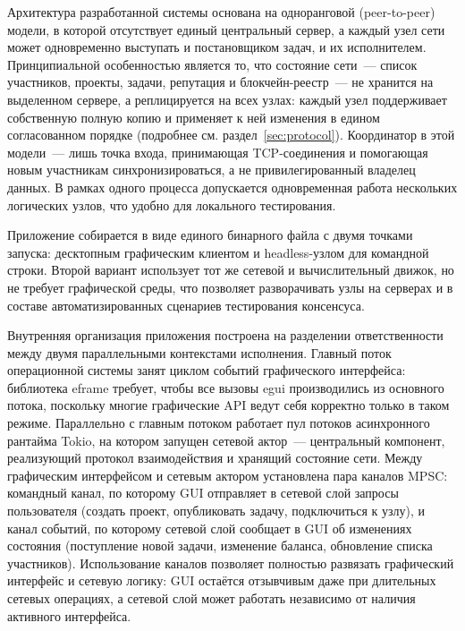 \documentclass[a4paper,11pt]{extarticle}
\begin{document}
Архитектура разработанной системы основана на одноранговой (peer-to-peer)
модели, в которой отсутствует единый центральный сервер, а каждый узел сети
может одновременно выступать и постановщиком задач, и их исполнителем.
Принципиальной особенностью является то, что состояние сети~--- список
участников, проекты, задачи, репутация и блокчейн-реестр~--- не хранится на
выделенном сервере, а реплицируется на всех узлах: каждый узел поддерживает
собственную полную копию и применяет к ней изменения в едином согласованном
порядке (подробнее см. раздел~\ref{sec:protocol}). Координатор в этой модели~---
лишь точка входа, принимающая TCP-соединения и помогающая новым участникам
синхронизироваться, а не привилегированный владелец данных. В рамках одного
процесса допускается одновременная работа нескольких логических узлов, что
удобно для локального тестирования.

Приложение собирается в виде единого бинарного файла с двумя точками запуска:
десктопным графическим клиентом и headless-узлом для командной строки. Второй
вариант использует тот же сетевой и вычислительный движок, но не требует
графической среды, что позволяет разворачивать узлы на серверах и в составе
автоматизированных сценариев тестирования консенсуса.

Внутренняя организация приложения построена на разделении ответственности
между двумя параллельными контекстами исполнения. Главный поток операционной
системы занят циклом событий графического интерфейса: библиотека eframe
требует, чтобы все вызовы egui производились из основного потока, поскольку
многие графические API ведут себя корректно только в таком режиме. Параллельно
с главным потоком работает пул потоков асинхронного рантайма Tokio, на котором
запущен сетевой актор~--- центральный компонент, реализующий протокол
взаимодействия и хранящий состояние сети. Между графическим интерфейсом и
сетевым актором установлена пара каналов MPSC: командный канал, по которому
GUI отправляет в сетевой слой запросы пользователя (создать проект, опубликовать
задачу, подключиться к узлу), и канал событий, по которому сетевой слой
сообщает в GUI об изменениях состояния (поступление новой задачи, изменение
баланса, обновление списка участников). Использование каналов позволяет
полностью развязать графический интерфейс и сетевую логику: GUI остаётся
отзывчивым даже при длительных сетевых операциях, а сетевой слой может
работать независимо от наличия активного интерфейса.
\end{document}
